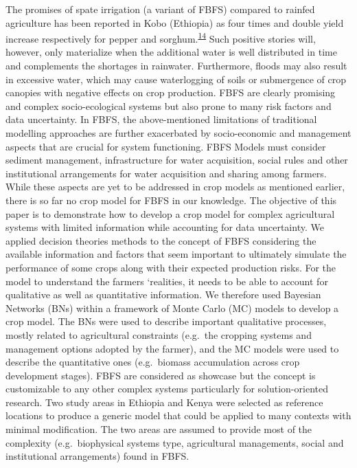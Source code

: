 \documentclass[12pt,oneside]{article}
\begin{document}
The promises of spate irrigation (a variant of FBFS) compared to rainfed agriculture has been reported in Kobo (Ethiopia) as four times and double yield increase respectively for pepper and sorghum.\textsuperscript{\protect\hyperlink{ref-VanSteenbergen_et_al_2011}{14}} Such positive stories will, however, only materialize when the additional water is well distributed in time and complements the shortages in rainwater. Furthermore, floods may also result in excessive water, which may cause waterlogging of soils or submergence of crop canopies with negative effects on crop production. FBFS are clearly promising and complex socio-ecological systems but also prone to many risk factors and data uncertainty. In FBFS, the above-mentioned limitations of traditional modelling approaches are further exacerbated by socio-economic and management aspects that are crucial for system functioning. FBFS Models must consider sediment management, infrastructure for water acquisition, social rules and other institutional arrangements for water acquisition and sharing among farmers. While these aspects are yet to be addressed in crop models as mentioned earlier, there is so far no crop model for FBFS in our knowledge. The objective of this paper is to demonstrate how to develop a crop model for complex agricultural systems with limited information while accounting for data uncertainty. We applied decision theories methods to the concept of FBFS considering the available information and factors that seem important to ultimately simulate the performance of some crops along with their expected production risks. For the model to understand the farmers `realities, it needs to be able to account for qualitative as well as quantitative information. We therefore used Bayesian Networks (BNs) within a framework of Monte Carlo (MC) models to develop a crop model. The BNs were used to describe important qualitative processes, mostly related to agricultural constraints (e.g.~the cropping systems and management options adopted by the farmer), and the MC models were used to describe the quantitative ones (e.g.~biomass accumulation across crop development stages). FBFS are considered as showcase but the concept is customizable to any other complex systems particularly for solution-oriented research. Two study areas in Ethiopia and Kenya were selected as reference locations to produce a generic model that could be applied to many contexts with minimal modification. The two areas are assumed to provide most of the complexity (e.g.~biophysical systems type, agricultural managements, social and institutional arrangements) found in FBFS.
\end{document}
